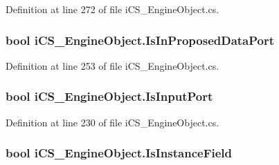 Definition at line 272 of file i\+C\+S\+\_\+\+Engine\+Object.\+cs.

\hypertarget{classi_c_s___engine_object_aa641b55daa513c7ef384e855515d4fb1}{
\subsubsection[{Is\+In\+Proposed\+Data\+Port}]{\setlength{\rightskip}{0pt plus 5cm}bool i\+C\+S\+\_\+\+Engine\+Object.\+Is\+In\+Proposed\+Data\+Port\hspace{0.3cm}{\ttfamily [get]}}}\label{classi_c_s___engine_object_aa641b55daa513c7ef384e855515d4fb1}


Definition at line 253 of file i\+C\+S\+\_\+\+Engine\+Object.\+cs.

\hypertarget{classi_c_s___engine_object_afcf1cf177e6d18a355c87d06142046f9}{
\subsubsection[{Is\+Input\+Port}]{\setlength{\rightskip}{0pt plus 5cm}bool i\+C\+S\+\_\+\+Engine\+Object.\+Is\+Input\+Port\hspace{0.3cm}{\ttfamily [get]}}}\label{classi_c_s___engine_object_afcf1cf177e6d18a355c87d06142046f9}


Definition at line 230 of file i\+C\+S\+\_\+\+Engine\+Object.\+cs.

\hypertarget{classi_c_s___engine_object_a828ad0b44ee7f8276731b20f7eed84e3}{
\subsubsection[{Is\+Instance\+Field}]{\setlength{\rightskip}{0pt plus 5cm}bool i\+C\+S\+\_\+\+Engine\+Object.\+Is\+Instance\+Field\hspace{0.3cm}{\ttfamily [get]}}}\label{classi_c_s___engine_object_a828ad0b44ee7f8276731b20f7eed84e3}


